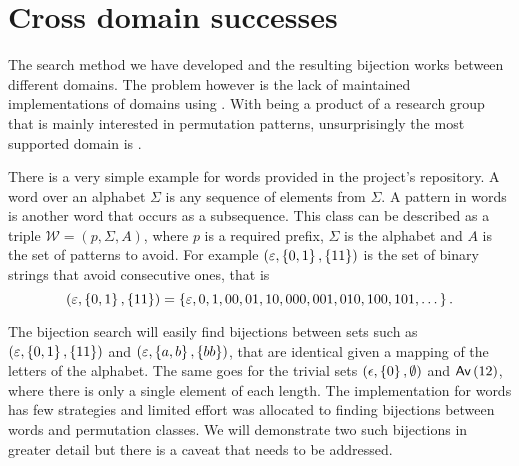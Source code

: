 
\label{ch:results}
\section{Cross domain successes}
The search method we have developed and the resulting bijection works between different domains. The problem however is the lack of maintained implementations of domains using \css{}. With \css{} being a product of a research group that is mainly interested in permutation patterns, unsurprisingly the most supported domain is \tsc{}.

There is a very simple example for words provided in the project's repository. A word over an alphabet $\Sigma$ is any sequence of elements from $\Sigma$. A pattern in words is another word that occurs as a subsequence. This class can be described as a triple $\mathcal{W} = (p, \Sigma, A)$, where $p$ is a required prefix, $\Sigma$ is the alphabet and $A$ is the set of patterns to avoid. For example $(\varepsilon, \left\{0,1\right\}, \left\{11\right\})$ is the set of binary strings that avoid consecutive ones, that is
\[
    (\varepsilon, \left\{0,1\right\}, \left\{11\right\}) = \left\{\varepsilon, 0, 1, 00, 01, 10, 000, 001, 010, 100, 101, \dotsc\right\}.
\]


The bijection search will easily find bijections between sets such as $(\varepsilon, \left\{0,1\right\}, \left\{11\right\})$ and $(\varepsilon, \left\{a,b\right\}, \left\{bb\right\})$, that are identical given a mapping of the letters of the alphabet. The same goes for the trivial sets $(\epsilon, \left\{0\right\}, \emptyset)$ and $\textsf{Av}\left(12\right)$, where there is only a single element of each length. The implementation for words has few strategies and limited effort was allocated to finding bijections between words and permutation classes. We will demonstrate two such bijections in greater detail but there is a caveat that needs to be addressed.

